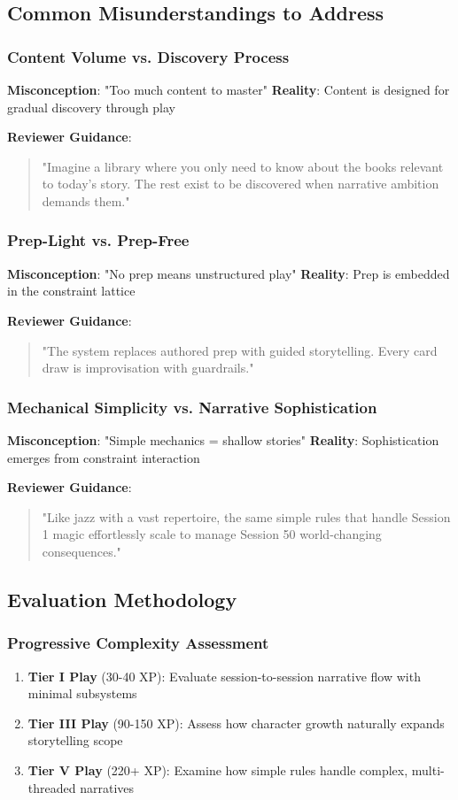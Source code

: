 \subsection{Common Misunderstandings to Address}

\subsubsection{Content Volume vs. Discovery Process}
\textbf{Misconception}: "Too much content to master"
\textbf{Reality}: Content is designed for gradual discovery through play

\textbf{Reviewer Guidance}: 
\begin{quote}
"Imagine a library where you only need to know about the books relevant to today's story. The rest exist to be discovered when narrative ambition demands them."
\end{quote}

\subsubsection{Prep-Light vs. Prep-Free}
\textbf{Misconception}: "No prep means unstructured play"
\textbf{Reality}: Prep is embedded in the constraint lattice

\textbf{Reviewer Guidance}:
\begin{quote}
"The system replaces authored prep with guided storytelling. Every card draw is improvisation with guardrails."
\end{quote}

\subsubsection{Mechanical Simplicity vs. Narrative Sophistication}
\textbf{Misconception}: "Simple mechanics = shallow stories"
\textbf{Reality}: Sophistication emerges from constraint interaction

\textbf{Reviewer Guidance}:
\begin{quote}
"Like jazz with a vast repertoire, the same simple rules that handle Session 1 magic effortlessly scale to manage Session 50 world-changing consequences."
\end{quote}

\subsection{Evaluation Methodology}

\subsubsection{Progressive Complexity Assessment}
\begin{enumerate}
    \item \textbf{Tier I Play} (30-40 XP): Evaluate session-to-session narrative flow with minimal subsystems
    \item \textbf{Tier III Play} (90-150 XP): Assess how character growth naturally expands storytelling scope  
    \item \textbf{Tier V Play} (220+ XP): Examine how simple rules handle complex, multi-threaded narratives
\end{enumerate}

